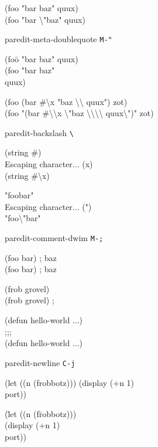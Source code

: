 \documentclass[10pt,landscape,a4paper]{article}
\newenvironment{nstabbing}
  {\setlength{\topsep}{-\parskip}%
   \setlength{\partopsep}{0.2em}%
   \tabbing}
  {\endtabbing}
\begin{document}
\begin{multicols}{4}
{(foo "bar \cursor baz" quux)\\
(foo "bar \textbackslash"\cursor baz" quux)
}

paredit-meta-doublequote \texttt{M-"}

{\ttfamily
\begin{nstabbing}
(foo\={} "bar \cursor baz" quux)\\
(foo "bar baz"\\
\>\cursor quux)
\end{nstabbing}

(foo \cursor(bar \#\textbackslash x "baz \textbackslash\textbackslash{} quux") zot)\\
(foo "\cursor(bar \#\textbackslash\textbackslash x \textbackslash"baz \textbackslash\textbackslash\textbackslash\textbackslash{} quux\textbackslash")" zot)
}

paredit-backslash \texttt{\textbackslash}

{\ttfamily
(string \#\cursor)\\
Escaping character... (x)\\
(string \#\textbackslash x\cursor)

"foo\cursor bar"\\
Escaping character... (")\\
"foo\textbackslash"\cursor bar"
}

paredit-comment-dwim \texttt{M-;}

{\ttfamily
\begin{nstabbing}
(foo \cursor bar) \space ; baz \space \space \space \space \=\\
(foo bar) \>; \cursor baz
\end{nstabbing}

\begin{nstabbing}
(frob grovel)\cursor \space \space \space \space \space \space \space \space\=\\
(frob grovel) \>;\cursor
\end{nstabbing}

\cursor(defun hello-world ...)\\
;;; \cursor\\
(defun hello-world ...)
}

paredit-newline \texttt{C-j}

{\ttfamily
\begin{nstabbing}
(let ((n (frobbotz))) \cursor (display (+n 1)\\
port))
\end{nstabbing}

\begin{nstabbing}
(\=let ((n (f\=robbotz)))\\
\>\cursor (display (+n 1)\\
\>\>
port))
\end{nstabbing}
}


\end{multicols}
\end{document}
